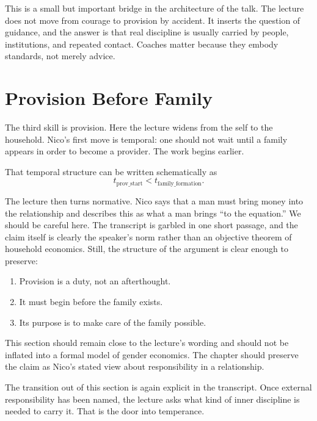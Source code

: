 This is a small but important bridge in the architecture of the talk. The lecture does not move from courage to provision by accident. It inserts the question of guidance, and the answer is that real discipline is usually carried by people, institutions, and repeated contact. Coaches matter because they embody standards, not merely advice.

\section{Provision Before Family}

The third skill is provision. Here the lecture widens from the self to the household. Nico's first move is temporal: one should not wait until a family appears in order to become a provider. The work begins earlier.

That temporal structure can be written schematically as
\begin{equation}
t_{\mathrm{prov\_start}} < t_{\mathrm{family\_formation}}.
\end{equation}

The lecture then turns normative. Nico says that a man must bring money into the relationship and describes this as what a man brings ``to the equation.'' We should be careful here. The transcript is garbled in one short passage, and the claim itself is clearly the speaker's norm rather than an objective theorem of household economics. Still, the structure of the argument is clear enough to preserve:
\begin{enumerate}
\item Provision is a duty, not an afterthought.
\item It must begin before the family exists.
\item Its purpose is to make care of the family possible.
\end{enumerate}

\begin{remark}
This section should remain close to the lecture's wording and should not be inflated into a formal model of gender economics. The chapter should preserve the claim as Nico's stated view about responsibility in a relationship.
\end{remark}

The transition out of this section is again explicit in the transcript. Once external responsibility has been named, the lecture asks what kind of inner discipline is needed to carry it. That is the door into temperance.

